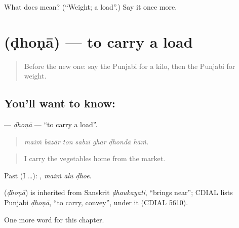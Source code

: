 \begin{tcolorbox}[breakable,colback=teal!4,colframe=teal!35!black,title={Before you move on}]
What does  mean? (\textquotedblleft{}Weight; a load\textquotedblright{}.) Say it once more.
\end{tcolorbox}
\section[\texorpdfstring{\pa{ਢੋਣਾ} (ḍhoṇā)}{ਢੋਣਾ (ḍhoṇā)}]{ (ḍhoṇā) — to carry a load}

\label{lesson:PA-C273-dhona-carry}



\begin{quote}
Before the new one: say the Punjabi for a kilo, then the Punjabi for weight.
\end{quote}

\subsection*{You'll want to know: }
\textbf{} — \emph{ḍhoṇā} — \textquotedblleft{}to carry a load\textquotedblright{}.

\begin{quote}
      
\end{quote}

\begin{quote}
\emph{maiṁ bāzār ton sabzī ghar ḍhondā hāṁ.}
\end{quote}

\begin{quote}
I carry the vegetables home from the market.
\end{quote}

Past (I …):   , \emph{maiṁ ālū ḍhoe}.

\begin{cousinweb}
\textbf{} (\emph{ḍhoṇā}) is inherited from Sanskrit \emph{ḍhaukayati}, \textquotedblleft{}brings near\textquotedblright{}; CDIAL lists Punjabi \emph{ḍhoṇā}, \textquotedblleft{}to carry, convey\textquotedblright{}, under it (CDIAL 5610).
\end{cousinweb}

\begin{grammarlens}[title={What you've built}]
One more word for this chapter.
\end{grammarlens}

